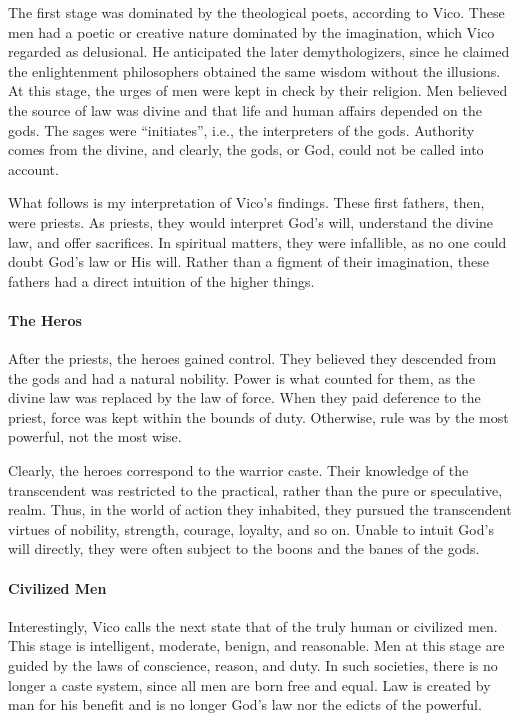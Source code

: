 The first stage was dominated by the theological poets, according to Vico. These men had a poetic or creative nature dominated by the imagination, which Vico regarded as delusional. He anticipated the later demythologizers, since he claimed the enlightenment philosophers obtained the same wisdom without the illusions. At this stage, the urges of men were kept in check by their religion. Men believed the source of law was divine and that life and human affairs depended on the gods. The sages were ``initiates'', i.e., the interpreters of the gods. Authority comes from the divine, and clearly, the gods, or God, could not be called into account.

What follows is my interpretation of Vico's findings. These first fathers, then, were priests. As priests, they would interpret God's will, understand the divine law, and offer sacrifices. In spiritual matters, they were infallible, as no one could doubt God's law or His will. Rather than a figment of their imagination, these fathers had a direct intuition of the higher things.

\paragraph{The Heros}


After the priests, the heroes gained control. They believed they descended from the gods and had a natural nobility. Power is what counted for them, as the divine law was replaced by the law of force. When they paid deference to the priest, force was kept within the bounds of duty. Otherwise, rule was by the most powerful, not the most wise.

Clearly, the heroes correspond to the warrior caste. Their knowledge of the transcendent was restricted to the practical, rather than the pure or speculative, realm. Thus, in the world of action they inhabited, they pursued the transcendent virtues of nobility, strength, courage, loyalty, and so on. Unable to intuit God's will directly, they were often subject to the boons and the banes of the gods.

\paragraph{Civilized Men}


Interestingly, Vico calls the next state that of the truly human or civilized men. This stage is intelligent, moderate, benign, and reasonable. Men at this stage are guided by the laws of conscience, reason, and duty. In such societies, there is no longer a caste system, since all men are born free and equal. Law is created by man for his benefit and is no longer God's law nor the edicts of the powerful.

